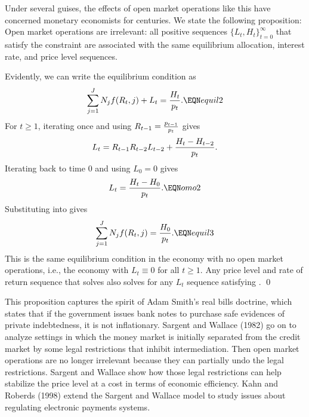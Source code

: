  Under several guises, the effects of open market operations
like this have concerned monetary economists for centuries.
We  state the following proposition:
\medskip
{}   Open market
operations are irrelevant: all positive sequences $\{L_t, H_t\}_{t=0}^\infty$
 that satisfy the constraint
  are associated with the same equilibrium allocation,
interest rate, and price level sequences.

\medskip
{}
Evidently, we can write the equilibrium condition  as
$$ \sum_{j=1}^J N_j f(R_t, j) + L_t = {H_{t}\over p_t}. \EQN equil2 $$
For $t \geq 1$,
iterating  once  and using $R_{t-1} = {p_{t-1} \over p_t}$
gives
$$ L_t = R_{t-1} R_{t-2} L_{t-2} + {H_t - H_{t-2} \over p_t} .$$
Iterating back to time $0$ and using $L_0 = 0$ gives
$$ L_t = {H_t - H_0\over p_t }. \EQN omo2 $$
Substituting  into  gives
$$ \sum_{j=1}^J N_j f(R_t, j)  = {H_{0}\over p_t}. \EQN equil3 $$
This is the same equilibrium condition in the economy with
no open market operations, i.e., the economy
with $L_t \equiv 0$ for all $t\geq 1$.   Any price level  and rate of
return sequence that solves  also solves  for
any $L_t$ sequence satisfying . \qed

\medskip
This proposition captures  the spirit of Adam Smith's
real bills doctrine, which states that if the
government issues bank notes to purchase safe evidences
of private indebtedness, it is not inflationary.
Sargent and Wallace (1982) go on to analyze
settings in which the money market is initially separated from
the credit market by some legal restrictions that inhibit
intermediation.  Then open market operations are no longer
irrelevant because they can  partially  undo the
legal restrictions.  Sargent and Wallace show how those
legal restrictions can help stabilize the
price level at a cost in terms of economic efficiency.
Kahn and Roberds (1998) extend the Sargent and Wallace model  to study
 issues about regulating electronic payments systems.
